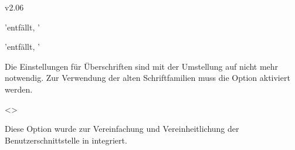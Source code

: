 \begin{Cessations}{v2.06}
\begin{Cessation}
  [\Option{cdfont=\PMisc}]
  {}
  'entfällt, '
\begin{Cessation}
  [\Option{cdfont=\PMisc}]
  {}
  'entfällt, '
\printdeclarationlist

Die Einstellungen für Überschriften sind mit der Umstellung auf \OpenSans nicht 
mehr notwendig. Zur Verwendung der alten Schriftfamilien muss die Option 
 aktiviert werden.
\end{Cessation}
\end{Cessation}

\begin{Cessation}
  {}
  <>
\printdeclarationlist

Diese Option wurde zur Vereinfachung und Vereinheitlichung der 
Benutzerschnittstelle in  integriert.
\end{Cessation}

\begin{Cessation}
  {}
\begin{Cessation}
  {}
\begin{Cessation}
  {}
\begin{Cessation}
  {}
\begin{Cessation}
  {}
\begin{Cessation}
  {}
\begin{Cessation}
  {}
\begin{Cessation}
  {}
\begin{Cessation}
  {}
\begin{Cessation}
  {}
\begin{Cessation}
  {}
\begin{Cessation}
  {}
\begin{Cessation}
  {}
\begin{Cessation}
  {}
\begin{Cessation}
  {}
\begin{Cessation}
  {}
\begin{Cessation}
  {}
\begin{Cessation}
  {}
\printdeclarationlist


\end{Cessation}
\end{Cessation}
\end{Cessation}
\end{Cessation}
\end{Cessation}
\end{Cessation}
\end{Cessation}
\end{Cessation}
\end{Cessation}
\end{Cessation}
\end{Cessation}
\end{Cessation}
\end{Cessation}
\end{Cessation}
\end{Cessation}
\end{Cessation}
\end{Cessation}
\end{Cessation}
\end{Cessations}
